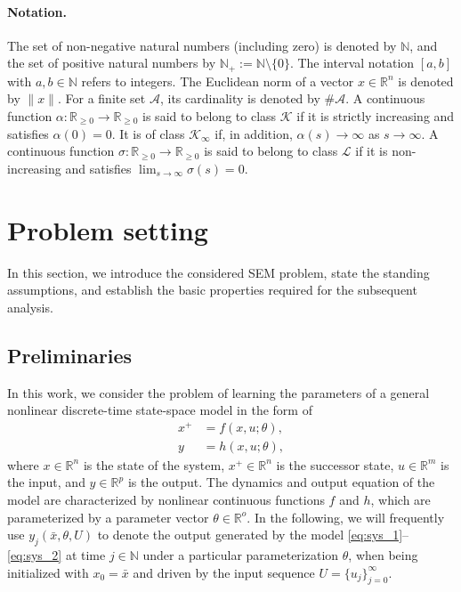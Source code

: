 \documentclass[a4paper,fleqn]{cas-dc}
\begin{document}
\paragraph{Notation.}
The set of non-negative natural numbers (including zero) is denoted by $\mathbb{N}$, and the set of positive natural numbers by $\mathbb{N}_{+}:=\mathbb{N}\setminus\{0\}$.
The interval notation $[a,b]$ with $a,b\in\mathbb{N}$ refers to integers. 
The Euclidean norm of a vector $x\in\mathbb{R}^n$ is denoted by $\|x\|$.
For a finite set \(\mathcal A\), its cardinality is denoted by \(\#\mathcal A\).
A continuous function $\alpha : \mathbb{R}_{\geq0} \to \mathbb{R}_{\geq0}$ is said to belong to class $\mathcal{K}$ if it is strictly increasing and satisfies $\alpha(0)=0$. It is of class $\mathcal{K}_\infty$ if, in addition, $\alpha(s) \to \infty$ as $s \to \infty$.
A continuous function $\sigma : \mathbb{R}_{\geq0} \to \mathbb{R}_{\geq0}$ is said to belong to class $\mathcal{L}$ if it is non-increasing and satisfies $\lim_{s \to \infty} \sigma(s) = 0$.

\section{Problem setting}

In this section, we introduce the considered SEM problem, state the standing assumptions, and establish the basic properties required for the subsequent analysis.

\subsection{Preliminaries}
In this work, we consider the problem of learning the parameters of a general nonlinear discrete-time state-space model in the form of
\begin{align}
	x^+ &= f(x,u;\theta),\label{eq:sys_1}\\
	y &= h(x,u;\theta),\label{eq:sys_2}
\end{align}
where $x\in\mathbb{R}^n$ is the state of the system, $x^+\in\mathbb{R}^n$ is the successor state, $u\in\mathbb{R}^m$ is the input, and $y\in\mathbb{R}^p$ is the output. The dynamics and output equation of the model are characterized by nonlinear continuous functions $f$ and $h$, which are parameterized by a parameter vector $\theta\in\mathbb{R}^o$.
In the following, we will frequently use $y_j(\bar{x},\theta,U)$ to denote the output generated by the model \eqref{eq:sys_1}--\eqref{eq:sys_2} at time $j\in\mathbb{N}$ under a particular parameterization $\theta$, when being initialized with $x_0 = \bar{x}$ and driven by the input sequence $U=\{u_j\}_{j=0}^\infty$.
\end{document}
